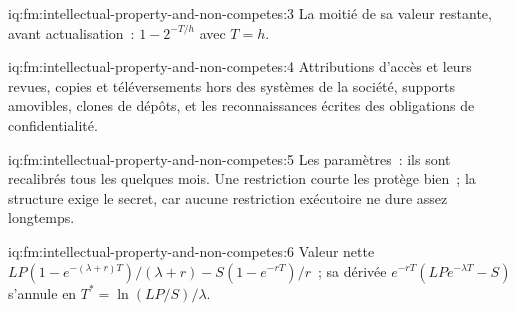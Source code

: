 \begin{solution}{iq:fm:intellectual-property-and-non-competes:3}
La moitié de sa valeur restante, avant actualisation~: $1-2^{-T/h}$ avec $T=h$.
\end{solution}

\begin{solution}{iq:fm:intellectual-property-and-non-competes:4}
Attributions d'accès et leurs revues, copies et téléversements hors des systèmes de la société, supports amovibles, clones de dépôts, et les
reconnaissances écrites des obligations de confidentialité.
\end{solution}

\begin{solution}{iq:fm:intellectual-property-and-non-competes:5}
Les paramètres~: ils sont recalibrés tous les quelques mois. Une restriction courte les protège bien~; la structure exige le secret, car aucune restriction exécutoire
ne dure assez longtemps.
\end{solution}

\begin{solution}{iq:fm:intellectual-property-and-non-competes:6}
Valeur nette $LP(1-e^{-(\lambda+r)T})/(\lambda+r)-S(1-e^{-rT})/r$~; sa dérivée $e^{-rT}(LPe^{-\lambda T}-S)$ s'annule en $T^*=\ln(LP/S)/\lambda$.
\end{solution}
